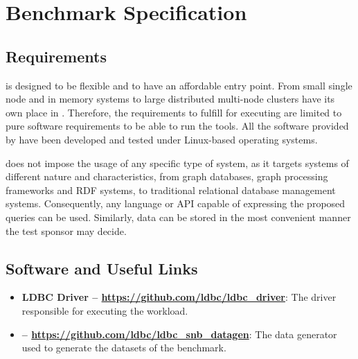 \chapter{Benchmark Specification}
\label{section:benchmark-specification}

\section{Requirements}

\ldbcsnb is designed to be flexible and to have an affordable entry point.
From small single node and in memory systems to large distributed multi-node
clusters have its own place in \ldbcsnb.  Therefore, the requirements to
fulfill for executing \ldbcsnb are limited to pure software requirements to be
able to run the tools. All the software provided by \ldbcsnb have been
developed and tested under Linux-based operating systems.

\ldbcsnb does not impose the usage of any specific type of system, as it
targets systems of different nature and characteristics, from graph databases,
graph processing frameworks and RDF systems, to traditional relational database
management systems. Consequently, any language or API capable of expressing the
proposed queries can be used. Similarly, data can be stored in the most
convenient manner the test sponsor may decide.



\section{Software and Useful Links}

\begin{itemize}
    \item \textbf{LDBC Driver -- \url{https://github.com/ldbc/ldbc_driver}}: The driver
    responsible for executing the \ldbcsnb workload.
    \item \textbf{\datagen -- \url{https://github.com/ldbc/ldbc_snb_datagen}}: The data
    generator used to generate the datasets of the benchmark.
\end{itemize}

